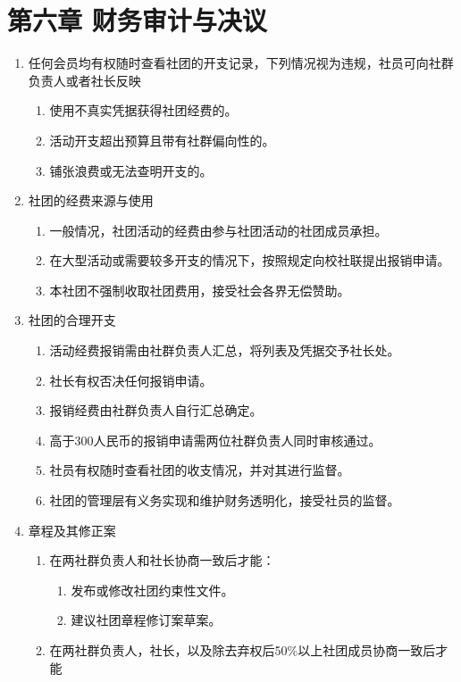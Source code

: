 \documentclass[a4paper]{article}
\newcommand\liststyleWWNumvii{%
\renewcommand\theenumi{\arabic{enumi}}
\renewcommand\theenumii{\arabic{enumi}.\arabic{enumii}}
\renewcommand\theenumiii{\arabic{enumi}.\arabic{enumii}.\arabic{enumiii}}
\renewcommand\theenumiv{\arabic{enumi}.\arabic{enumii}.\arabic{enumiii}.\arabic{enumiv}}
\renewcommand\labelenumi{\theenumi.}
\renewcommand\labelenumii{\theenumii.}
\renewcommand\labelenumiii{\theenumiii.}
\renewcommand\labelenumiv{\theenumiv.}
}
\begin{document}
\bigskip

\section[第六章 财务审计与决议]{第六章 财务审计与决议}
\liststyleWWNumvii
\begin{enumerate}
\item 任何会员均有权随时查看社团的开支记录，下列情况视为违规，社员可向社群负责人或者社长反映

\begin{enumerate}
\item 使用不真实凭据获得社团经费的。
\item 活动开支超出预算且带有社群偏向性的。
\item 铺张浪费或无法查明开支的。
\end{enumerate}
\item 社团的经费来源与使用

\begin{enumerate}
\item 一般情况，社团活动的经费由参与社团活动的社团成员承担。
\item 在大型活动或需要较多开支的情况下，按照规定向校社联提出报销申请。
\item 本社团不强制收取社团费用，接受社会各界无偿赞助。
\end{enumerate}
\item 社团的合理开支

\begin{enumerate}
\item 活动经费报销需由社群负责人汇总，将列表及凭据交予社长处。
\item 社长有权否决任何报销申请。
\item 报销经费由社群负责人自行汇总确定。
\item 高于300人民币的报销申请需两位社群负责人同时审核通过。
\item 社员有权随时查看社团的收支情况，并对其进行监督。
\item 社团的管理层有义务实现和维护财务透明化，接受社员的监督。
\end{enumerate}
\item 章程及其修正案

\begin{enumerate}
\item 在两社群负责人和社长协商一致后才能：

\begin{enumerate}
\item 发布或修改社团约束性文件。
\item 建议社团章程修订案草案。
\end{enumerate}
\item 在两社群负责人，社长，以及除去弃权后50\%以上社团成员协商一致后才能


\end{enumerate}
\end{enumerate}
\end{document}
